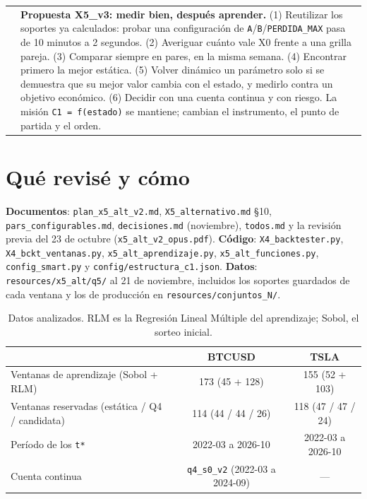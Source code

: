 \documentclass[11pt,a4paper]{article}
\makeatletter
\newcommand{\code}[1]{\texttt{\small #1}}
\newenvironment{caja}[1]{%
  \par\medskip\noindent
  \begin{tabular}{@{}p{0.4em}@{\hspace{8pt}}p{\dimexpr\linewidth-2em\relax}@{}}
  \textcolor{#1}{\rule{3pt}{1.1em}} &
}{\end{tabular}\par\medskip}
\newenvironment{clave}{\begin{caja}{cmorado}}{\end{caja}}
\makeatother
\begin{document}
\begin{clave}
\textbf{Propuesta X5\_v3: medir bien, después aprender.} (1) Reutilizar los soportes ya calculados:
probar una configuración de \code{A}/\code{B}/\code{PERDIDA\_MAX} pasa de 10 minutos a 2 segundos.
(2) Averiguar cuánto vale X0 frente a una grilla pareja. (3) Comparar siempre en pares, en la misma
semana. (4) Encontrar primero la mejor estática. (5) Volver dinámico un parámetro solo si se demuestra que
su mejor valor cambia con el estado, y medirlo contra un objetivo económico. (6) Decidir con una cuenta
continua y con riesgo. La misión \code{C1 = f(estado)} se mantiene; cambian el instrumento, el punto de
partida y el orden.
\end{clave}

\section{Qué revisé y cómo}

\textbf{Documentos}: \code{plan\_x5\_alt\_v2.md}, \code{X5\_alternativo.md} §10, \code{pars\_configurables.md},
\code{decisiones.md} (noviembre), \code{todos.md} y la revisión previa del 23 de octubre
(\code{x5\_alt\_v2\_opus.pdf}). \textbf{Código}: \code{X4\_backtester.py}, \code{X4\_bckt\_ventanas.py},
\code{x5\_alt\_aprendizaje.py}, \code{x5\_alt\_funciones.py}, \code{config\_smart.py} y
\code{config/estructura\_c1.json}. \textbf{Datos}: \code{resources/x5\_alt/q5/} al 21 de noviembre,
incluidos los soportes guardados de cada ventana y los de producción en \code{resources/conjuntos\_N/}.

\begin{table}[h]
\centering\small
\begin{tabular}{lcc}
\toprule
 & BTCUSD & TSLA \\
\midrule
Ventanas de aprendizaje (Sobol + RLM) & 173 (45 + 128) & 155 (52 + 103) \\
Ventanas reservadas (estática / Q4 / candidata) & 114 (44 / 44 / 26) & 118 (47 / 47 / 24) \\
Período de los \code{t*} & 2022-03 a 2026-10 & 2022-03 a 2026-10 \\
Cuenta continua & \code{q4\_s0\_v2} (2022-03 a 2024-09) & — \\
\bottomrule
\end{tabular}
\caption{Datos analizados. RLM es la Regresión Lineal Múltiple del aprendizaje; Sobol, el sorteo inicial.}
\end{table}
\end{document}
